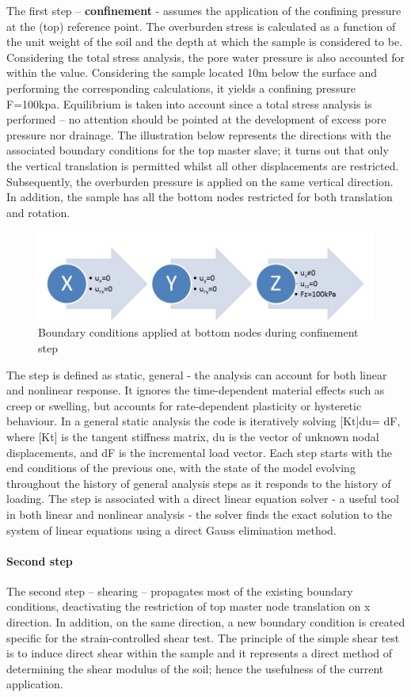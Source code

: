 \documentclass[10pt,a4paper]{report}
\begin{document}
The first step – \textbf{confinement }- assumes the application of the confining pressure at the (top) reference point. The overburden stress is calculated as a function of the unit weight of the soil and the depth at which the sample is considered to be. Considering the total stress analysis, the pore water pressure is also accounted for within the value. Considering the sample located 10m below the surface and performing the corresponding calculations, it yields a confining pressure F=100kpa. Equilibrium is taken into account since a total stress analysis is performed – no attention should be pointed at the development of excess pore pressure nor drainage. The illustration below represents the directions with the associated boundary conditions for the top master slave; it turns out that only the vertical translation is permitted whilst all other displacements are restricted. Subsequently, the overburden pressure is applied on the same vertical direction. In addition, the sample has all the bottom nodes restricted for both translation and rotation. 

\begin{figure}[h!]
	\centering
	\includegraphics[width=0.7\linewidth]{"bc1d"}
	\caption{Boundary conditions applied at bottom nodes during confinement step}
	\label{bc1}
\end{figure}

The step is defined as static, general - the analysis can account for both linear and nonlinear response. It ignores the time-dependent material effects such as creep or swelling, but accounts for rate-dependent plasticity or hysteretic behaviour. In a general static analysis the code is iteratively solving [Kt]{du}= {dF}, where [Kt] is the tangent stiffness matrix, {du} is the vector of unknown nodal displacements, and {dF} is the incremental load vector. Each step starts with the end conditions of the previous one, with the state of the model evolving throughout the history of general analysis steps as it responds to the history of loading. The step is associated with a direct linear equation solver - a useful tool in both linear and nonlinear analysis - the solver finds the exact solution to the system of linear equations using a direct Gauss elimination method. 
\paragraph{Second step}
The second step – shearing – propagates most of the existing boundary conditions, deactivating the restriction of top master node translation on x direction. In addition, on the same direction, a new boundary condition is created specific for the strain-controlled shear test. The principle of the simple shear test is to induce direct shear within the sample and it represents a direct method of determining the shear modulus of the soil; hence the usefulness of the current application.
\end{document}
